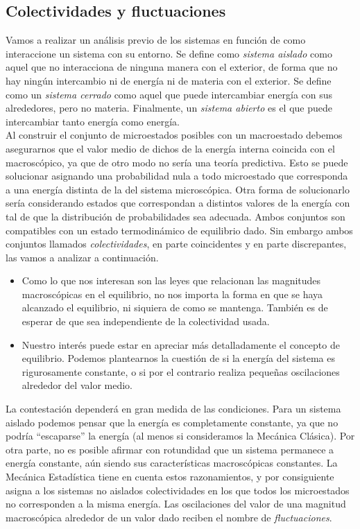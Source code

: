\documentclass[12pt,a4paper]{article}
\numberwithin{equation}{section}
\numberwithin{figure}{section}
\theoremstyle{definition}
\begin{document}
\subsection{Colectividades y fluctuaciones}

Vamos a realizar un análisis previo de los sistemas en función de como interaccione un sistema con su entorno. Se define como \textit{sistema aislado} como aquel que no interacciona de ninguna manera con el exterior, de forma que no hay ningún intercambio ni de energía ni de materia con el exterior. Se define como un \textit{sistema cerrado} como aquel que puede intercambiar energía con sus alrededores, pero no materia. Finalmente, un \textit{sistema abierto} es el que puede intercambiar tanto energía como energía. \\

Al construir el conjunto de microestados posibles con un macroestado debemos asegurarnos que el valor medio de dichos de la energía interna coincida con el macroscópico, ya que de otro modo no sería una teoría predictiva. Esto se puede solucionar asignando una probabilidad nula a todo microestado que corresponda a una energía distinta de la del sistema microscópica. Otra forma de solucionarlo sería considerando estados que correspondan a distintos valores de la energía con tal de que la distribución de probabilidades sea adecuada. Ambos conjuntos son compatibles con un estado termodinámico de equilibrio dado. Sin embargo ambos conjuntos llamados \textit{colectividades}, en parte coincidentes y en parte discrepantes, las vamos a analizar a continuación. \\ 

\begin{itemize}
\item  Como lo que nos interesan son las leyes que relacionan las magnitudes macroscópicas en el equilibrio, no nos importa la forma en que se haya alcanzado el equilibrio, ni siquiera de como se mantenga. También es de esperar de que sea independiente de la colectividad usada. \\
\item Nuestro interés puede estar en apreciar más detalladamente el concepto de equilibrio. Podemos plantearnos la cuestión de si la energía del sistema es rigurosamente constante, o si por el contrario realiza pequeñas oscilaciones alrededor del valor medio.
\end{itemize}

La contestación dependerá en gran medida de las condiciones. Para un sistema aislado podemos pensar que la energía es completamente constante, ya que no podría ``escaparse'' la energía (al menos si consideramos la Mecánica Clásica). Por otra parte, no es posible afirmar con rotundidad que un sistema permanece a energía constante, aún siendo sus características macroscópicas constantes. La Mecánica Estadística tiene en cuenta estos razonamientos, y por consiguiente asigna a los sistemas no aislados colectividades en los que todos los microestados no corresponden a la misma energía. Las oscilaciones del valor de una magnitud macroscópica alrededor de un valor dado reciben el nombre de \textit{fluctuaciones}. \\
\end{document}
